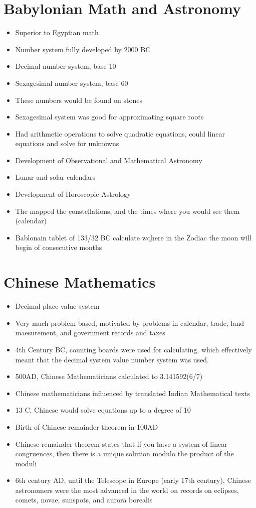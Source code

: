 \documentclass{article}
\begin{document}
\section*{Babylonian Math and Astronomy}
\begin{itemize}
  \item Superior to Egyptian math
  \item Number system fully developed by 2000 BC
  \item Decimal number system, base 10
  \item Sexagesimal number system, base 60
  \item These numbers would be found on stones
  \item Sexagesimal system was good for approximating square roots
  \item Had arithmetic operations to solve quadratic equations,
    could linear equations and solve for unknowns
  \item Development of Observational and Mathematical Astronomy
  \item Lunar and solar calendars
  \item Development of Horoscopic Astrology
  \item The mapped the constellations, and the times where you would see them (calendar)
  \item Bablonain tablet of 133/32 BC calculate wqhere in the Zodiac the moon will begin of consecutive months
\end{itemize}

\section*{Chinese Mathematics}
\begin{itemize}
  \item Decimal place value system
  \item Very much problem based, motivated by problems in calendar, trade, land maesurement, and government
    records and taxes
  \item 4th Century BC, counting boards were used for calculating, which
    effectively meant that the decimal system value number system was used.
  \item 500AD, Chinese Mathematicians calculated \pi{} to 3.141592(6/7)
  \item Chinese mathematicians influenced by translated Indian Mathematical texts
  \item 13 C, Chinese would solve equations up to a degree of 10
  \item Birth of Chinese remainder theorem in 100AD
  \item Chinese remainder theorem states that if you have a system of linear congruences,
    then there is a unique solution modulo the product of the moduli
  \item 6th century AD, until the Telescope in Europe (early 17th century),
    Chinese astronomers were the most advanced in the world on records
    on eclipses, comets, novae, sunspots, and aurora borealis
\end{itemize}
\end{document}
